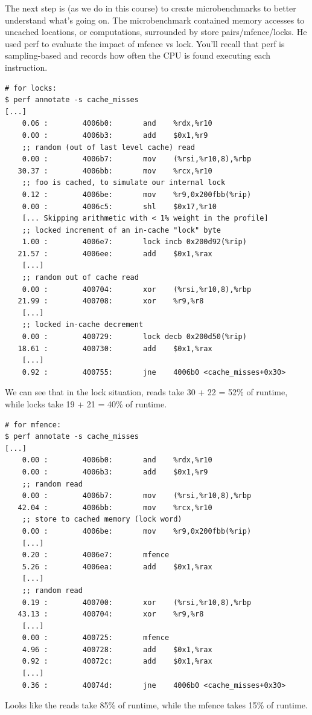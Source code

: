 \documentclass[a4paper]{report}
\begin{document}
The next step is (as we do in this course) to create microbenchmarks to better understand what's
going on. The microbenchmark contained memory accesses to uncached locations, or computations,
surrounded by store pairs/mfence/locks. He used perf to evaluate the impact of mfence vs lock.
You'll recall that perf is sampling-based and records how often the CPU is found executing each
instruction.

{\scriptsize
\begin{lstlisting}
# for locks:
$ perf annotate -s cache_misses
[...]
    0.06 :        4006b0:       and    %rdx,%r10
    0.00 :        4006b3:       add    $0x1,%r9
    ;; random (out of last level cache) read
    0.00 :        4006b7:       mov    (%rsi,%r10,8),%rbp
   30.37 :        4006bb:       mov    %rcx,%r10
    ;; foo is cached, to simulate our internal lock
    0.12 :        4006be:       mov    %r9,0x200fbb(%rip)
    0.00 :        4006c5:       shl    $0x17,%r10
    [... Skipping arithmetic with < 1% weight in the profile]
    ;; locked increment of an in-cache "lock" byte
    1.00 :        4006e7:       lock incb 0x200d92(%rip)
   21.57 :        4006ee:       add    $0x1,%rax
    [...]
    ;; random out of cache read
    0.00 :        400704:       xor    (%rsi,%r10,8),%rbp
   21.99 :        400708:       xor    %r9,%r8
    [...]
    ;; locked in-cache decrement
    0.00 :        400729:       lock decb 0x200d50(%rip)
   18.61 :        400730:       add    $0x1,%rax
    [...]
    0.92 :        400755:       jne    4006b0 <cache_misses+0x30>
\end{lstlisting}
}

We can see that in the lock situation, reads take 30 + 22 = 52\% of runtime,
while locks take 19 + 21 = 40\% of runtime.

{\scriptsize
\begin{lstlisting}
# for mfence:
$ perf annotate -s cache_misses
[...]
    0.00 :        4006b0:       and    %rdx,%r10
    0.00 :        4006b3:       add    $0x1,%r9
    ;; random read
    0.00 :        4006b7:       mov    (%rsi,%r10,8),%rbp
   42.04 :        4006bb:       mov    %rcx,%r10
    ;; store to cached memory (lock word)
    0.00 :        4006be:       mov    %r9,0x200fbb(%rip)
    [...]
    0.20 :        4006e7:       mfence 
    5.26 :        4006ea:       add    $0x1,%rax
    [...]
    ;; random read
    0.19 :        400700:       xor    (%rsi,%r10,8),%rbp
   43.13 :        400704:       xor    %r9,%r8
    [...]
    0.00 :        400725:       mfence 
    4.96 :        400728:       add    $0x1,%rax
    0.92 :        40072c:       add    $0x1,%rax
    [...]
    0.36 :        40074d:       jne    4006b0 <cache_misses+0x30>
\end{lstlisting}
}
Looks like the reads take 85\% of runtime,
while the mfence takes 15\% of runtime.
\end{document}

